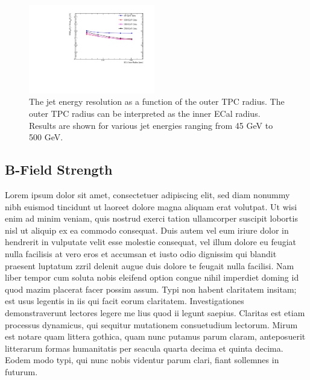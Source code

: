 \documentclass[final,3p,times,twocolumn]{elsarticle}
\begin{document}
\begin{figure}[!h]
  \begin{center}
     \includegraphics[width=0.49\textwidth]{7_GlobalParamScan/JER_vs_ECalInnerRadius.pdf}
      \caption{The jet energy resolution as a function of the outer TPC radius.  The outer TPC radius can be interpreted as the inner ECal radius.  Results are shown for various jet energies ranging from 45 GeV to 500 GeV.\label{}}
  \end{center}
\end{figure}

\subsection{B-Field Strength}
Lorem ipsum dolor sit amet, consectetuer adipiscing elit, sed diam nonummy nibh euismod tincidunt ut laoreet dolore magna aliquam erat volutpat. Ut wisi enim ad minim veniam, quis
nostrud exerci tation ullamcorper suscipit lobortis nisl ut aliquip ex ea commodo consequat. Duis autem vel eum iriure dolor in hendrerit in vulputate velit esse molestie consequat,
vel illum dolore eu feugiat nulla facilisis at vero eros et accumsan et iusto odio dignissim qui blandit praesent luptatum zzril delenit augue duis dolore te feugait nulla facilisi.
Nam liber tempor cum soluta nobis eleifend option congue nihil imperdiet doming id quod mazim placerat facer possim assum. Typi non habent claritatem insitam; est usus legentis in
iis qui facit eorum claritatem. Investigationes demonstraverunt lectores legere me lius quod ii legunt saepius. Claritas est etiam processus dynamicus, qui sequitur mutationem
consuetudium lectorum. Mirum est notare quam littera gothica, quam nunc putamus parum claram, anteposuerit litterarum formas humanitatis per seacula quarta decima et quinta
decima. Eodem modo typi, qui nunc nobis videntur parum clari, fiant sollemnes in futurum.
\end{document}
